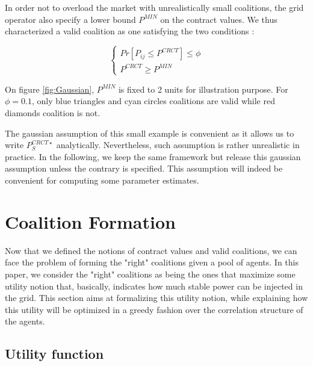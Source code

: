 \documentclass[conference]{IEEEtran}
\begin{document}
In order not to overload the market with unrealistically small coalitions, the grid operator also specify a lower bound $ P^{MIN} $ on the contract values. We thus characterized a valid coalition as one satisfying the two conditions :

\begin{equation}
\left\{ \begin{array}{lll}
			Pr[P_{ij} \leq P^{CRCT}] \leq \phi \\
			P^{CRCT} \geq P^{MIN}
\end{array} \right.
\end{equation}

On figure \ref{fig:Gaussian}, $ P^{MIN} $ is fixed to 2 units for illustration purpose. For $ \phi = 0.1 $, only blue triangles and cyan circles coalitions are valid while red diamonds coalition is not.

The gaussian assumption of this small example is convenient as it allows us to write $ P_{S}^{CRCT \star} $ analytically. Nevertheless, such assumption is rather unrealistic in practice. In the following, we keep the same framework but release this gaussian assumption unless the contrary is specified. This assumption will indeed be convenient for computing some parameter estimates.

%
%

\section{Coalition Formation}
\label{sec:forming}

Now that we defined the notions of contract values and valid coalitions, we can face the problem of forming the "right" coalitions given a pool of agents. In this paper, we consider the "right" coalitions as being the ones that maximize some utility notion that, basically, indicates how much stable power can be injected in the grid. This section aims at formalizing this utility notion, while explaining how this utility will be optimized in a greedy fashion over the correlation structure of the agents. 


\subsection{Utility function}
\end{document}
